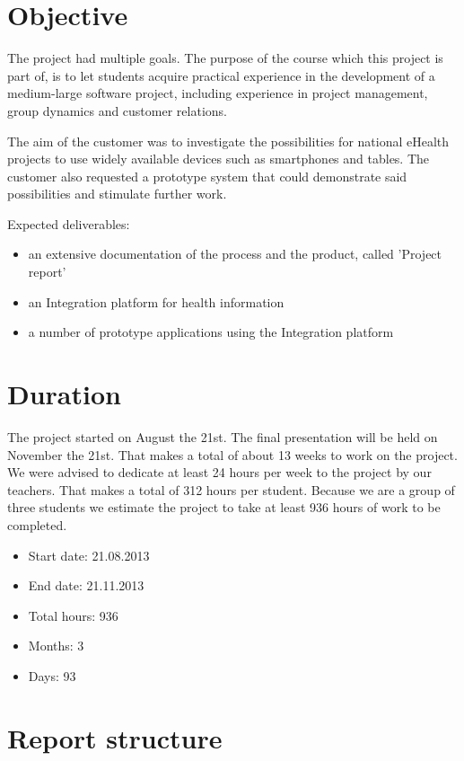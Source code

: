 \section{Objective}
\label{section:objective}

The project had multiple goals.
The purpose of the course which this project is part of, is to let students acquire practical experience
in the development of a medium-large software project, including experience in project management,
group dynamics and customer relations.

The aim of the customer was to investigate the possibilities for national eHealth projects to use widely available
devices such as smartphones and tables. The customer also requested a prototype system that could demonstrate said
possibilities and stimulate further work.

Expected deliverables:
\begin{itemize}
\item an extensive documentation of the process and the product, called 'Project report'
\item an Integration platform for health information
\item a number of prototype applications using the Integration platform
\end{itemize}

\section{Duration}
\label{section:duration}
The project started on August the 21st. The final presentation will be held on November the 21st.
That makes a total of about 13 weeks to work on the project.
We were advised to dedicate at least 24 hours per week to the project by our teachers.
That makes a total of 312 hours per student. Because we are a group of three students we estimate
the project to take at least 936 hours of work to be completed.

\begin{itemize}
\item Start date: 21.08.2013
\item End date: 21.11.2013
\item Total hours: 936
\item Months: 3
\item Days: 93
\end{itemize}

\section{Report structure}

